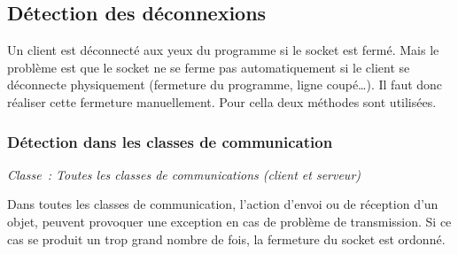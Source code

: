 \documentclass[a4paper,11pt]{report}
\begin{document}
  \subsection{Détection des déconnexions}
    Un client est déconnecté aux yeux du programme si le socket est fermé. Mais le problème est que le socket ne se ferme pas automatiquement si le client se déconnecte physiquement (fermeture du programme, ligne coupé…). Il faut donc réaliser cette fermeture manuellement. Pour cella deux méthodes sont utilisées.
    
  \subsubsection{Détection dans les classes de communication}
    \begin{center}
    \textit{Classe : Toutes les classes de communications (client et serveur)}
    \end{center}
      Dans toutes les classes de communication, l’action d’envoi ou de réception d’un objet, peuvent provoquer une exception en cas de problème de transmission. Si ce cas se produit un trop grand nombre de fois, la fermeture du socket est ordonné.
    
\end{document}
